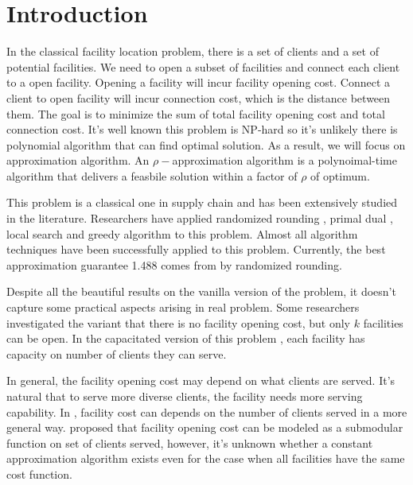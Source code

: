 \section{Introduction}

In the classical facility location problem, there is a set of clients and a set of potential facilities. We need to open a subset of facilities and connect each client to a open facility. Opening a facility will incur facility opening cost. Connect a client to open facility will incur connection cost, which is the distance between them. The goal is to minimize the sum of total facility opening cost and total connection cost. It's well known this problem is NP-hard so it's unlikely there is polynomial algorithm that can find optimal solution. As a result, we will focus on approximation algorithm. An $\rho-$approximation algorithm is a polynoimal-time algorithm that delivers a feasbile solution within a factor of $\rho$ of optimum.

This problem is a classical one in supply chain and has been extensively studied in the literature. Researchers have applied randomized rounding \cite{shmoys1997approximation, li20131, chudak2003improved}, primal dual \cite{jain2001approximation}, local search\cite{korupolu2000analysis} and greedy algorithm \cite{jain2003greedy} to this problem. Almost all algorithm techniques have been successfully applied to this problem. Currently, the best approximation guarantee 1.488 comes from \cite{li20131} by randomized rounding.

Despite all the beautiful results on the vanilla version of the problem, it doesn't capture some practical aspects arising in real problem. Some researchers \cite{li2013approximating,jain2001approximation,arya2004local} investigated the variant that there is no facility opening cost, but only $k$ facilities can be open. In the capacitated version of this problem \cite{chudak2005improved,an2014lp,pal2001facility,bansal20125}, each facility has capacity on number of clients they can serve.

In general, the facility opening cost may depend on what clients are served. It's natural that to serve more diverse clients, the facility needs more serving capability. In \cite{mahdian2003universal}, facility cost can depends on the number of clients served in a more general way. \cite{svitkina2006facility} proposed that facility opening cost can be modeled as a submodular function on set of clients served, however, it's unknown whether a constant approximation algorithm exists even for the case when all facilities have the same cost function.

